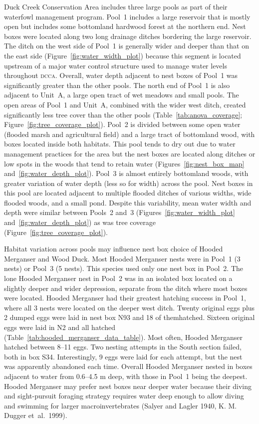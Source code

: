 
Duck Creek Conservation Area includes three large pools as part of their waterfowl management program. Pool~1 includes a large reservoir that is mostly open but includes some bottomland hardwood forest at the northern end. Nest boxes were located along two long drainage ditches bordering the large reservoir. The ditch on the west side of Pool~1 is generally wider and deeper than that on the east side (Figure~\ref{fig:water_width_plot}) because this segment is located upstream of a major water control structure used to manage water levels throughout \textsc{dcca}. Overall, water depth adjacent to nest boxes of Pool~1 was significantly greater than the other pools. The north end of Pool~1 is also adjacent to Unit~A, a large open tract of wet meadows and small pools. The open areas of Pool~1 and Unit~A, combined with the wider west ditch, created significantly less tree cover than the other pools (Table~\ref{tab:anova_coverage}; Figure~\ref{fig:tree_coverage_plot}). Pool~2 is divided between some open water (flooded marsh and agricultural field) and a large tract of bottomland wood, with boxes located inside both habitats.  This pool tends to dry out due to water management practices for the area but the nest boxes are located along ditches or low spots in the woods that tend to retain water (Figures~\ref{fig:nest_box_map} and~\ref{fig:water_depth_plot}).  Pool~3 is almost entirely bottomland woods, with greater variation of water depth (less so for width) across the pool. Nest boxes in this pool are located adjacent to multiple flooded ditches of various widths, wide flooded woods, and a small pond. Despite this variability, mean water width and depth were similar between Pools~2 and~3 (Figures~\ref{fig:water_width_plot} and~\ref{fig:water_depth_plot}) as was tree coverage (Figure~\ref{fig:tree_coverage_plot}). 

Habitat variation across pools may influence nest box choice of Hooded Merganser and Wood Duck. Most Hooded Merganser nests were in Pool~1 (3 nests) or Pool~3 (5 nests). This species used only one nest box in Pool~2. The lone Hooded Merganser nest in Pool~2 was in an isolated box located on a slightly deeper and wider depression, separate from the ditch where most boxes were located. Hooded Merganser had their greatest hatching success in Pool~1, where all 3 nests were located on the deeper west ditch. Twenty original eggs plus 2 dumped eggs were laid in nest box N93 and 18 of themhatched.  Sixteen original eggs were laid in N2 and all hatched (Table~\ref{tab:hooded_merganser_data_table}).  Most often, Hooded Merganser hatched between 8–11 eggs. Two nesting attempts in the South section failed, both in box S34. Interestingly, 9 eggs were laid for each attempt, but the nest was apparently abandoned each time. Overall Hooded Merganser nested in boxes adjacent to water from 0.6–4.5 m deep, with those in Pool~1 being the deepest. Hooded Merganser may prefer nest boxes near deeper water because their diving and sight-pursuit foraging strategy requires water deep enough to allow diving and swimming for larger macroinvertebrates (Salyer and Lagler 1940, K. M. Dugger et~al.~1999).  

